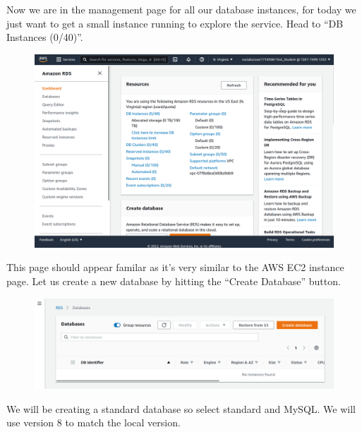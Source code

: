 \documentclass{csse4400}
\begin{document}
Now we are in the management page for all our database instances,
for today we just want to get a small instance running to explore the service.
Head to ``DB Instances (0/40)''.

\begin{figure}[H]
\includegraphics[width=\textwidth]{images/aws_2}
\end{figure}

This page should appear familar as it's very similar to the AWS EC2 instance page.
Let us create a new database by hitting the ``Create Database'' button.

\begin{figure}[H]
\includegraphics[width=\textwidth]{images/aws_3}
\end{figure}



We will be creating a standard database so select standard and MySQL.
We will use version 8 to match the local version.
\end{document}
